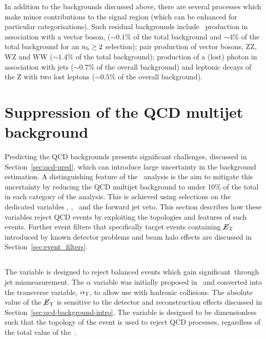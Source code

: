 In addition to the backgrounds discussed above, there are several processes which 
make minor contributions to the signal region (which can be enhanced
for particular categorisations). Such residual backgrounds include \ttbar~production in association with a vector
boson, \ttV ($\sim0.1\%$ of the total background and $\sim4\%$ of the total background for an $n_{\mathrm{b}} \ge 2$ selection); 
pair production of vector bosons, ZZ, WZ and WW ($\sim1.4\%$ of the total background); 
production of a (lost) photon in association with jets ($\sim0.7\%$ of the overall background) and
leptonic decays of the Z with two lost leptons ($\sim0.5\%$ of the overall background).

\section{Suppression of the QCD multijet background}
\label{sec:important-variables}

Predicting the QCD backgrounds presents significant challenges, discussed in Section~\ref{sec:qcd-pred}, which
can introduce large uncertainty in the background estimation. A distinguishing feature
of the \alphat~analysis is the aim to mitigate this uncertainty by reducing the 
QCD multijet background to under 10\% of the total in each category of the analysis. 
This is achieved using selections on the dedicated variables \alphat, \bdphi, \mhtmet~and the forward jet veto. This section
describes how these variables reject QCD events by exploiting the topologies and features of such events. Further
event filters that specifically target events containing $\mbox{$\cancel{E}_\text{T}$}$ introduced by
known detector problems and beam halo effects are discussed in Section~\ref{sec:event_filters}.

\subsection{\alphat}
The \alphat variable is designed to reject balanced events which gain significant~\met through
jet mismeasurement. The $\alpha$ variable was initially proposed in~\cite{Randall} and
converted into the transverse variable, $\alpha_{\text{T}}$, to allow use with hadronic collisions. The absolute
value of the $\mbox{$\cancel{E}_\text{T}$}$ is sensitive to the detector and reconstruction effects discussed in Section~\ref{sec:qcd-background-intro}. 
The \alphat variable is designed to be dimensionless such that the topology of the event is used to reject 
QCD processes, regardless of the total value of the~\met.

